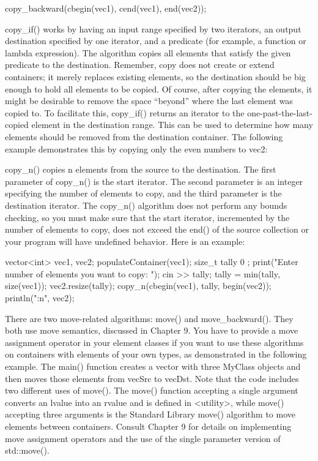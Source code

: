 \begin{cpp}
copy_backward(cbegin(vec1), cend(vec1), end(vec2));
\end{cpp}

copy\_if() works by having an input range specified by two iterators, an output destination specified by one iterator, and a predicate (for example, a function or lambda expression). The algorithm copies all elements that satisfy the given predicate to the destination. Remember, copy does not create or extend containers; it merely replaces existing elements, so the destination should be big enough to hold all elements to be copied. Of course, after copying the elements, it might be desirable to remove the space “beyond” where the last element was copied to. To facilitate this, copy\_if() returns an iterator to the one-past-the-last-copied element in the destination range. This can be used to determine how many elements should be removed from the destination container. The following example demonstrates this by copying only the even numbers to vec2:


copy\_n() copies n elements from the source to the destination. The first parameter of copy\_n() is the start iterator. The second parameter is an integer specifying the number of elements to copy, and the third parameter is the destination iterator. The copy\_n() algorithm does not perform any bounds checking, so you must make sure that the start iterator, incremented by the number of elements to copy, does not exceed the end() of the source collection or your program will have undefined behavior. Here is an example:

\begin{cpp}
vector<int> vec1, vec2;
populateContainer(vec1);
size_t tally { 0 };
print("Enter number of elements you want to copy: ");
cin >> tally;
tally = min(tally, size(vec1));
vec2.resize(tally);
copy_n(cbegin(vec1), tally, begin(vec2));
println("{:n}", vec2);
\end{cpp}


There are two move-related algorithms: move() and move\_backward(). They both use move semantics, discussed in Chapter 9. You have to provide a move assignment operator in your element classes if you want to use these algorithms on containers with elements of your own types, as demonstrated in the following example. The main() function creates a vector with three MyClass objects and then moves those elements from vecSrc to vecDst. Note that the code includes two different uses of move(). The move() function accepting a single argument converts an lvalue into an rvalue and is defined in <utility>, while move() accepting three arguments is the Standard Library move() algorithm to move elements between containers. Consult Chapter 9 for details on implementing move assignment operators and the use of the single parameter version of std::move().

